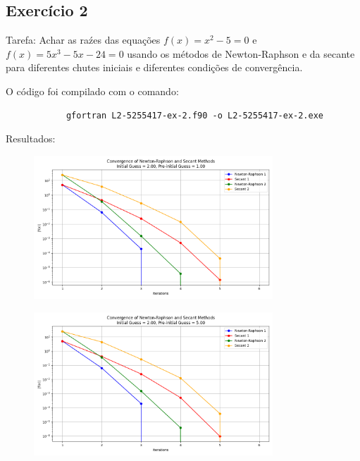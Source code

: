 \documentclass[12pt, a4paper]{article} %
\begin{document}
    \subsection{Exerc\'icio 2}

        Tarefa: Achar as ra\'zes das equa\c{c}\~oes $f(x) = x^2 - 5 = 0$ e $f(x) = 5x^3 - 5x - 24 = 0$ usando os m\'etodos de Newton-Raphson e da secante para diferentes chutes iniciais e diferentes condi\c{c}\~oes de converg\^encia.


        O c\'odigo foi compilado com o comando:
        \begin{verbatim}
            gfortran L2-5255417-ex-2.f90 -o L2-5255417-ex-2.exe
        \end{verbatim}

        Resultados:

        \begin{figure}[H]
            \centering
            \includegraphics[width=0.8\textwidth]{../images/convergence-initial-20-preinitial-10.png}
            \caption{}
        \end{figure}

        \begin{figure}[H]
            \centering
            \includegraphics[width=0.8\textwidth]{../images/convergence-initial-20-preinitial-50.png}
            \caption{}
        \end{figure}
        
\end{document}
